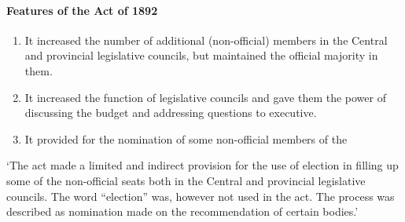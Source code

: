 \begin{multicol}{2}
\paragraph{Features of the Act of 1892}
\begin{enumerate}
  \item It increased the number of additional (non-official) members in the Central and provincial legislative councils, but maintained the official majority in them.
  \item It increased the function of legislative councils and gave them the power of discussing the budget and addressing questions to executive.
  \item It provided for the nomination of some non-official members of the
\end{enumerate}
`The act made a limited and indirect provision for the use of election in filling up some of the non-official seats both in the Central and provincial legislative councils. The word ``election'' was, however not used in the act. The process was described as nomination made on the recommendation of certain bodies.'


\end{multicol}

